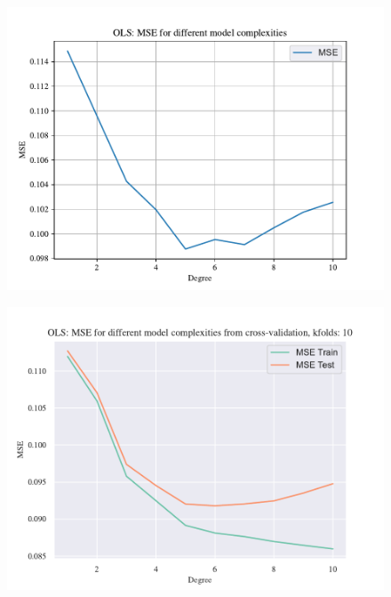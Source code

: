 \begin{figure}[h!]
    \centering
    \includegraphics[width=1\linewidth]{project_1_alt/figures/data/OLS_MSE_Franke_Noise_bootstrap.pdf}
    \caption{}
    \label{fig:olsfrankebootstrap}
\end{figure}

\begin{figure}[h!]
    \centering
    \includegraphics[width=1\linewidth]{project_1_alt/figures/data/OLS_MSE_Franke_Noise_CV_k10.pdf}
    \caption{}
    \label{fig:cvk10franke}
\end{figure}

